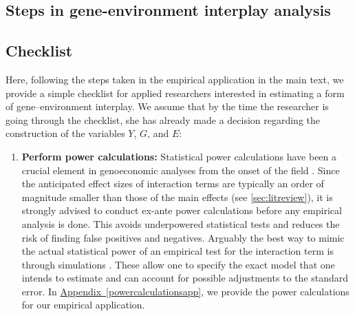 \documentclass[12pt,a4paper]{article}
\begin{document}
\begin{bibunit}
\clearpage
\renewcommand{\thetable}{E.\arabic{table}}
\renewcommand{\thefigure}{E.\arabic{figure}}
\renewcommand{\theequation}{E.\arabic{equation}}
\setcounter{table}{0} 
\setcounter{figure}{0} 
\setcounter{equation}{0} 

\section{Steps in gene-environment interplay analysis} 
\subsection{Checklist} 
\label{sec:checklist}
Here, following the steps taken in the empirical application in the main text, we provide a simple checklist for applied researchers interested in estimating a form of gene--environment interplay. We assume that by the time the researcher is going through the checklist, she has already made a decision regarding the construction of the variables $Y$, $G$, and $E$:
\begin{enumerate}
    \item \textbf{Perform power calculations:}  
    Statistical power calculations have been a crucial element in genoeconomic analyses from the onset of the field \citep{Benjamin2011}. Since the anticipated effect sizes of interaction terms are typically an order of magnitude smaller than those of the main effects (see \autoref{sec:litreview}), it is strongly advised to conduct ex-ante power calculations before any empirical analysis is done. This avoids underpowered statistical tests and reduces the risk of finding false positives and negatives. Arguably the best way to mimic the actual statistical power of an empirical test for the interaction term is through simulations \citep{Duncan2011}. These allow one to specify the exact model that one intends to estimate and can account for possible adjustments to the standard error. In  \hyperref[powercalculationsapp]{Appendix~\ref*{powercalculationsapp}}, we provide the power calculations for our empirical application.
    

\end{enumerate}
\end{bibunit}
\end{document}
